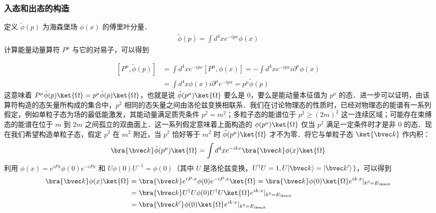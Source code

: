 
\subsubsection{入态和出态的构造}
定义 $\tilde{\phi}(p)$ 为海森堡场 $\phi(x)$ 的傅里叶分量．
\begin{equation}
\begin{aligned}
\tilde\phi(p)=\int d^4 {x} e^{-ipx} \phi(x)
\end{aligned}
\end{equation}
计算能量动量算符 $P^\mu$ 与它的对易子，可以得到

\begin{equation}\label{LSZ_eq2}
\begin{aligned}
[P^\mu, \tilde\phi(p)] &=\int d^4 {x} e^{-ipx} [P^\mu,\phi(x)]=-\int d^4 {x} e^{-ipx} i\partial^\mu \phi(x)\\
&=\int d^4 {x} \phi(x) i\partial^\mu e^{-ipx}=p^\mu \tilde\phi(p)
\end{aligned}
\end{equation}
这意味着 $P^\mu \tilde \phi(p)\ket{\Omega}=p^\mu \tilde{\phi}(p)\ket{\Omega}$，也就是说 $\tilde\phi (p^\mu) \ket{\Omega}$ 要么是 $0$，要么是能动量本征值为 $p^\mu$ 的态．进一步可以证明，由该算符构造的态矢量所构成的集合中，$p^2$ 相同的态矢量之间由洛伦兹变换相联系．我们在讨论物理态的性质时，已经对物理态的能谱有一系列假定，例如单粒子态为场的最低能激发，其能动量满足质壳条件 $p^2=m^2$；多粒子态的能谱位于 $p^2\ge (2m)^2$ 这一连续区域；可能存在束缚态的能谱在位于 $m$ 到 $2m$ 之间孤立的双曲面上．这一系列假定意味着上面构造的 $\phi(p^\mu)\ket{\Omega}$ 仅当 $p^2$ 满足一定条件时才是非 $0$ 的态．现在我们希望构造单粒子态，假定 $p^2$ 在 $m^2$ 附近，当 $p^2$ 恰好等于 $m^2$ 时 $\tilde{\phi}(p^\mu)\ket{\Omega}$ 才不为零．将它与单粒子态 $\ket{\bvec k}$ 作内积：
\[
\bra{\bvec k} \tilde\phi(p^\mu) \ket{\Omega}=\int d^4 {x} e^{-ikx}\bra{\bvec k}\phi(x)\ket{\Omega}
\]
利用 $\phi(x)=e^{iPx}\phi(0)e^{-iPx}$ 和 $U\phi(0)U^{-1}=\phi(0)$（其中 $U$ 是洛伦兹变换，$U^\dagger U=1,U |\bvec k\rangle = |\bvec k'\rangle$），可以得到
\begin{equation}\begin{aligned}
\bra{\bvec k}\phi(x)\ket{\Omega}&=
\bra{\bvec k}e^{iP\cdot x}\phi(0) e^{-i P\cdot x}\ket{\Omega} = \bra{\bvec k}\phi(0)\ket{\Omega} e^{ik\cdot x}|_{k^0=E_{\bvec k}} \\
&=\bra{\bvec k}U^\dagger U\phi(0)U^\dagger U\ket{\Omega} e^{ik\cdot x}|_{k^0=E_{\bvec k}}\\
&=\bra{\bvec k'}\phi(0)\ket{\Omega} e^{ik\cdot x}|_{k^0=E_{\bvec k}}
\end{aligned}\end{equation}
